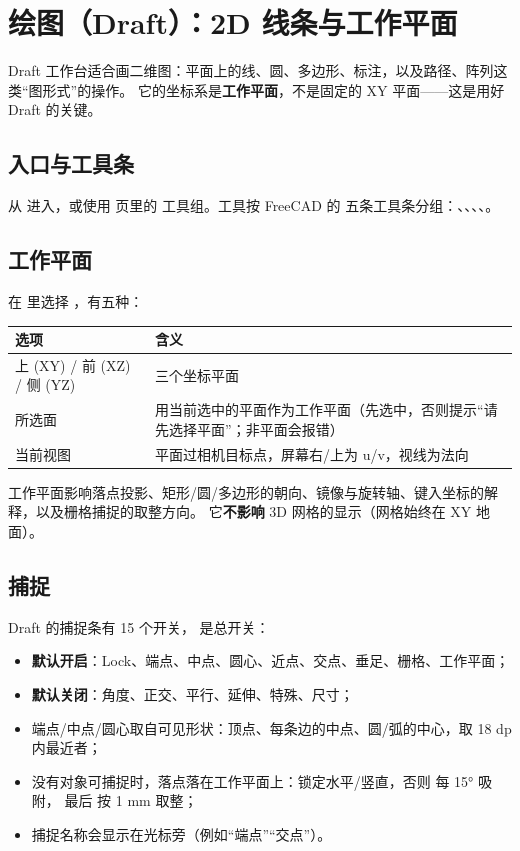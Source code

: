 \chapter{绘图（Draft）：2D 线条与工作平面}

Draft 工作台适合画二维图：平面上的线、圆、多边形、标注，以及路径、阵列这类“图形式”的操作。
它的坐标系是\textbf{工作平面}，不是固定的 XY 平面——这是用好 Draft 的关键。

\section{入口与工具条}

从  进入，或使用  页里的  工具组。工具按 FreeCAD 的
五条工具条分组：、、、、。

\section{工作平面}

在  里选择 ，有五种：

\begin{center}
\small
\begin{tabularx}{\linewidth}{@{}lX@{}}
\toprule
\textbf{选项} & \textbf{含义} \\
\midrule
上 (XY) / 前 (XZ) / 侧 (YZ) & 三个坐标平面 \\
所选面 & 用当前选中的平面作为工作平面（先选中，否则提示“请先选择平面”；非平面会报错）\\
当前视图 & 平面过相机目标点，屏幕右/上为 u/v，视线为法向 \\
\bottomrule
\end{tabularx}
\end{center}

工作平面影响落点投影、矩形/圆/多边形的朝向、镜像与旋转轴、键入坐标的解释，以及栅格捕捉的取整方向。
它\textbf{不影响} 3D 网格的显示（网格始终在 XY 地面）。

\section{捕捉}

Draft 的捕捉条有 15 个开关， 是总开关：

\begin{itemize}
  \item \textbf{默认开启}：Lock、端点、中点、圆心、近点、交点、垂足、栅格、工作平面；
  \item \textbf{默认关闭}：角度、正交、平行、延伸、特殊、尺寸；
  \item 端点/中点/圆心取自可见形状：顶点、每条边的中点、圆/弧的中心，取 18 dp 内最近者；
  \item 没有对象可捕捉时，落点落在工作平面上：锁定水平/竖直，否则  每 15° 吸附，
        最后  按 1 mm 取整；
  \item 捕捉名称会显示在光标旁（例如“端点”“交点”）。
\end{itemize}

